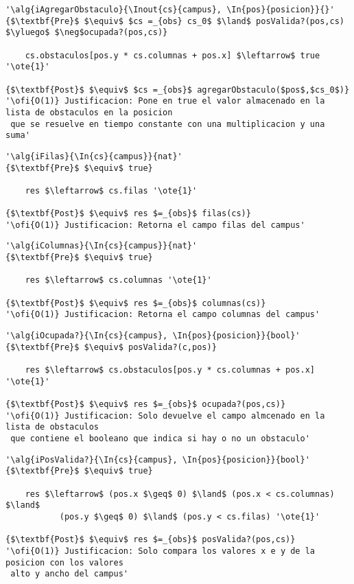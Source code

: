 \begin{lstlisting}[mathescape]
'\alg{iAgregarObstaculo}{\Inout{cs}{campus}, \In{pos}{posicion}}{}'
{$\textbf{Pre}$ $\equiv$ $cs =_{obs} cs_0$ $\land$ posValida?(pos,cs) $\yluego$ $\neg$ocupada?(pos,cs)}

	cs.obstaculos[pos.y * cs.columnas + pos.x] $\leftarrow$ true '\ote{1}'	

{$\textbf{Post}$ $\equiv$ $cs =_{obs}$ agregarObstaculo($pos$,$cs_0$)}
'\ofi{O(1)} Justificacion: Pone en true el valor almacenado en la lista de obstaculos en la posicion 
 que se resuelve en tiempo constante con una multiplicacion y una suma'
\end{lstlisting}

\begin{lstlisting}[mathescape]
'\alg{iFilas}{\In{cs}{campus}}{nat}'
{$\textbf{Pre}$ $\equiv$ true}

	res $\leftarrow$ cs.filas '\ote{1}'

{$\textbf{Post}$ $\equiv$ res $=_{obs}$ filas(cs)}
'\ofi{O(1)} Justificacion: Retorna el campo filas del campus'
\end{lstlisting}

\begin{lstlisting}[mathescape]
'\alg{iColumnas}{\In{cs}{campus}}{nat}'
{$\textbf{Pre}$ $\equiv$ true}

	res $\leftarrow$ cs.columnas '\ote{1}'

{$\textbf{Post}$ $\equiv$ res $=_{obs}$ columnas(cs)}
'\ofi{O(1)} Justificacion: Retorna el campo columnas del campus'
\end{lstlisting}

\begin{lstlisting}[mathescape]
'\alg{iOcupada?}{\In{cs}{campus}, \In{pos}{posicion}}{bool}'
{$\textbf{Pre}$ $\equiv$ posValida?(c,pos)}

	res $\leftarrow$ cs.obstaculos[pos.y * cs.columnas + pos.x] '\ote{1}'

{$\textbf{Post}$ $\equiv$ res $=_{obs}$ ocupada?(pos,cs)}
'\ofi{O(1)} Justificacion: Solo devuelve el campo almcenado en la lista de obstaculos 
 que contiene el booleano que indica si hay o no un obstaculo'
\end{lstlisting}

\begin{lstlisting}[mathescape]
'\alg{iPosValida?}{\In{cs}{campus}, \In{pos}{posicion}}{bool}'
{$\textbf{Pre}$ $\equiv$ true}

	res $\leftarrow$ (pos.x $\geq$ 0) $\land$ (pos.x < cs.columnas) $\land$ 
	       (pos.y $\geq$ 0) $\land$ (pos.y < cs.filas) '\ote{1}'

{$\textbf{Post}$ $\equiv$ res $=_{obs}$ posValida?(pos,cs)}
'\ofi{O(1)} Justificacion: Solo compara los valores x e y de la posicion con los valores 
 alto y ancho del campus'
\end{lstlisting}

